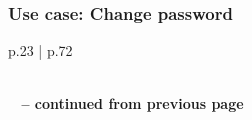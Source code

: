 \documentclass[11pt,a4paper]{report}
\begin{document}
\subsubsection{Use case: Change password}

\begin{longtable}{p{} | p{}}
    \caption{Use case: Change password} \label{tab:ucUpdatePassword} \\
    \endfirsthead
        {{\bfseries \tablename\ \thetable{} -- continued from previous page}} \\
         \\
    \endhead
         \\ 
    \endfoot
    \endlastfoot
    

\end{longtable}
\end{document}
